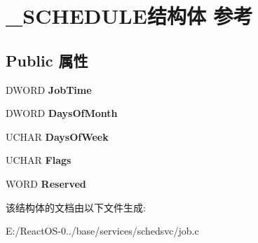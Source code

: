 \hypertarget{struct___s_c_h_e_d_u_l_e}{}\section{\+\_\+\+S\+C\+H\+E\+D\+U\+L\+E结构体 参考}
\label{struct___s_c_h_e_d_u_l_e}
\subsection*{Public 属性}
\begin{DoxyCompactItemize}
\item 
\mbox{\label{struct___s_c_h_e_d_u_l_e_a544a86ddb74a2079bdeb4fe0455bda5c}} 
D\+W\+O\+RD {\bfseries Job\+Time}
\item 
\mbox{\label{struct___s_c_h_e_d_u_l_e_a66fb368c28b649ec4b037379d6500e4c}} 
D\+W\+O\+RD {\bfseries Days\+Of\+Month}
\item 
\mbox{\label{struct___s_c_h_e_d_u_l_e_a802b4ac6bc6e88ffd0498a5541f8825e}} 
U\+C\+H\+AR {\bfseries Days\+Of\+Week}
\item 
\mbox{\label{struct___s_c_h_e_d_u_l_e_a326cc447d5e990c12f79fb779cf25360}} 
U\+C\+H\+AR {\bfseries Flags}
\item 
\mbox{\label{struct___s_c_h_e_d_u_l_e_aad30e3e3aba1485720906329f13f5401}} 
W\+O\+RD {\bfseries Reserved}
\end{DoxyCompactItemize}


该结构体的文档由以下文件生成\+:\begin{DoxyCompactItemize}
\item 
E\+:/\+React\+O\+S-\/0../base/services/schedsvc/job.\+c\end{DoxyCompactItemize}
